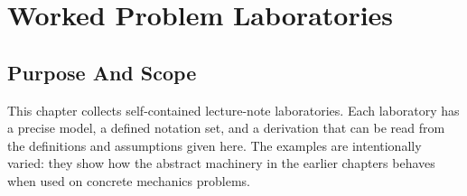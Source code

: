 \chapter{Worked Problem Laboratories}
\label{chap:worked-problem-labs}

\section{Purpose And Scope}
\label{sec:worked-problem-labs-purpose}

This chapter collects self-contained lecture-note laboratories. Each laboratory
has a precise model, a defined notation set, and a derivation that can be read
from the definitions and assumptions given here. The examples are intentionally
varied: they show how the abstract machinery in the earlier chapters behaves
when used on concrete mechanics problems.

